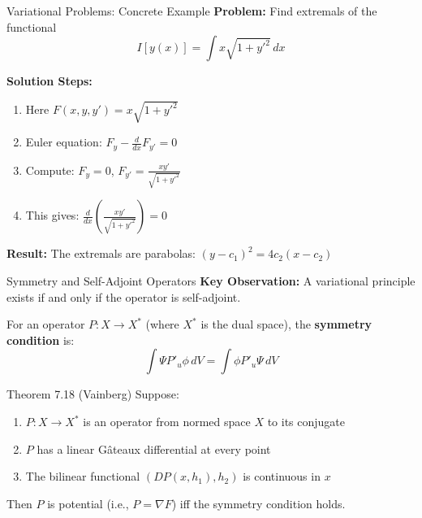 \documentclass[aspectratio=169,10pt]{beamer}
\begin{document}
\begin{frame}[fragile]{Variational Problems: Concrete Example}
  \textbf{Problem:} Find extremals of the functional
  \[
    I[y(x)] = \int x\sqrt{1 + y'^2} \, dx
  \]

  \vspace{0.3cm}
  \textbf{Solution Steps:}
  \begin{enumerate}
    \item Here $F(x, y, y') = x\sqrt{1 + y'^2}$
    \item Euler equation: $F_y - \frac{d}{dx}F_{y'} = 0$
    \item Compute: $F_y = 0$, \quad $F_{y'} = \frac{xy'}{\sqrt{1 + y'^2}}$
    \item This gives: $\frac{d}{dx}\left(\frac{xy'}{\sqrt{1 + y'^2}}\right) = 0$
  \end{enumerate}

  \vspace{0.3cm}
  \textbf{Result:} The extremals are parabolas: $(y - c_1)^2 = 4c_2(x - c_2)$
\end{frame}

\begin{frame}{Symmetry and Self-Adjoint Operators}
  \textbf{Key Observation:} A variational principle exists if and only if the operator is self-adjoint.

  \vspace{0.3cm}
  For an operator $P: X \to X^*$ (where $X^*$ is the dual space), the \textbf{symmetry condition} is:
  \[
    \int \Psi P'_u \phi \, dV = \int \phi P'_u \Psi \, dV
  \]

  \vspace{0.3cm}
  \begin{block}{Theorem 7.18 (Vainberg)}
    Suppose:
    \begin{enumerate}
      \item $P: X \to X^*$ is an operator from normed space $X$ to its conjugate
      \item $P$ has a linear Gâteaux differential at every point
      \item The bilinear functional $(DP(x, h_1), h_2)$ is continuous in $x$
    \end{enumerate}
    Then $P$ is potential (i.e., $P = \nabla F$) iff the symmetry condition holds.
  \end{block}
\end{frame}
\end{document}
